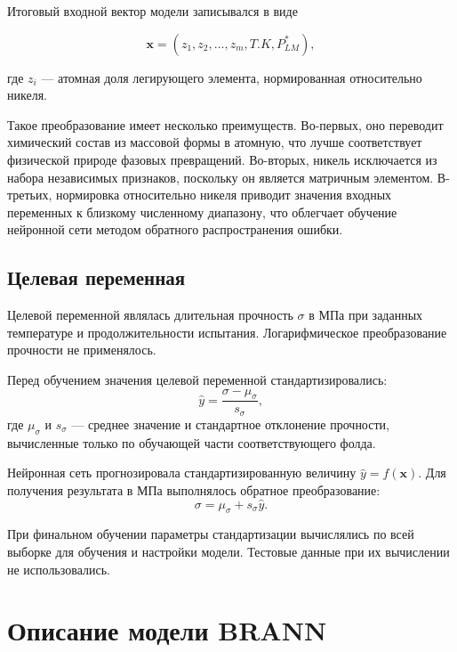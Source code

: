 Итоговый входной вектор модели записывался в виде

\begin{equation}
\mathbf{x} =
\left(
z_1, z_2, \ldots, z_m, T.K, P_{LM}^{*}
\right),
\end{equation}

где $z_i$ --- атомная доля легирующего элемента, нормированная 
относительно никеля.

Такое преобразование имеет несколько преимуществ. 
Во-первых, оно переводит химический состав из массовой формы в атомную, 
что лучше соответствует физической природе фазовых превращений. 
Во-вторых, никель исключается из набора независимых признаков, 
поскольку он является матричным элементом. 
В-третьих, нормировка относительно никеля приводит значения входных 
переменных к близкому численному диапазону, что облегчает 
обучение нейронной сети методом обратного распространения ошибки.


\subsection{Целевая переменная}

Целевой переменной являлась длительная прочность $\sigma$ в МПа
при заданных температуре и продолжительности испытания.
Логарифмическое преобразование прочности не применялось.

Перед обучением значения целевой переменной стандартизировались:
\begin{equation}
    \hat{y} = \frac{\sigma - \mu_{\sigma}}{s_{\sigma}},
\end{equation}
где $\mu_{\sigma}$ и $s_{\sigma}$ --- среднее значение и стандартное
отклонение прочности, вычисленные только по обучающей части
соответствующего фолда.

Нейронная сеть прогнозировала стандартизированную величину
$\hat{y}=f(\mathbf{x})$. Для получения результата в МПа
выполнялось обратное преобразование:
\begin{equation}
    \sigma = \mu_{\sigma} + s_{\sigma}\hat{y}.
\end{equation}

При финальном обучении параметры стандартизации вычислялись
по всей выборке для обучения и настройки модели.
Тестовые данные при их вычислении не использовались.

\section{Описание модели BRANN}

